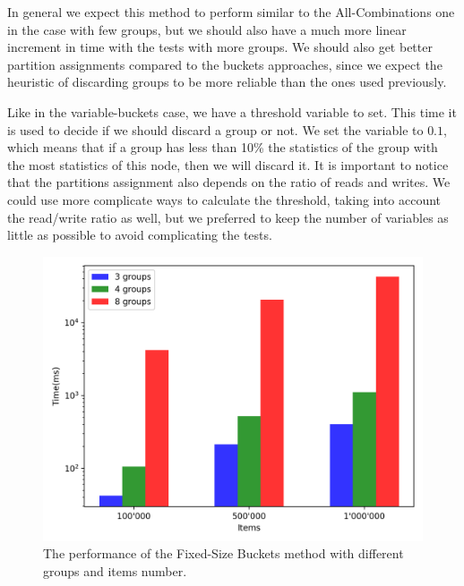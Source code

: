 In general we expect this method to perform similar to the All-Combinations one in the case with few groups, but we should also have a much more linear increment in time with the tests with more groups. We should also get better partition assignments compared to the buckets approaches, since we expect the heuristic of discarding groups to be more reliable than the ones used previously.

Like in the variable-buckets case, we have a threshold variable to set. This time it is used to decide if we should discard a group or not. We set the variable to $0.1$, which means that if a group has less than 10\% the statistics of the group with the most statistics of this node, then we will discard it. It is important to notice that the partitions assignment also depends on the ratio of reads and writes. We could use more complicate ways to calculate the threshold, taking into account the read/write ratio as well, but we preferred to keep the number of variables as little as possible to avoid complicating the tests.

\begin{figure}[!htb]
  \centering
  \includegraphics[width=\textwidth,height=\textheight,keepaspectratio]{img/hot.png}
  \caption[caption]{The performance of the Fixed-Size Buckets method with different groups and items number.}
  \label{fig:hot}
\end{figure}

